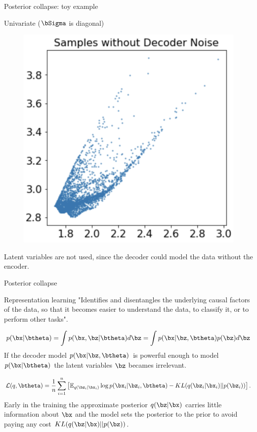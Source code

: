 \begin{frame}{Posterior collapse: toy example}
\begin{block}{Univariate ($\bSigma$ is diagonal)}
\begin{minipage}[t]{0.33\columnwidth}
\begin{figure}[h]
		\end{figure}
		\end{minipage}%
		\begin{minipage}[t]{0.33\columnwidth}
		\begin{figure}[h]
			\centering
			\includegraphics[width=.75\linewidth]{figs/posterior_collapse_toy_6.png}
		\end{figure}
		\end{minipage}
	Latent variables are not used, since the decoder could model the data without the encoder.
	\end{block}
\end{frame}
\begin{frame}{Posterior collapse}
	\begin{block}{Representation learning}
		"Identifies and disentangles the underlying causal factors of the data, so that it becomes easier to understand the data, to classify it, or to perform other tasks".
	\end{block}
	\[
		p(\bx | \btheta) = \int p(\bx, \bz | \btheta) d \bz = \int p(\bx | \bz, \btheta) p(\bz) d \bz 
	\]
	If the decoder model $p(\bx | \bz, \btheta)$ is powerful enough to model $p(\bx | \btheta)$ the latent variables $\bz$ becames irrelevant.
	
	\[
		\mathcal{L}(q, \btheta) = \frac{1}{n} \sum_{i=1}^n \left[ \mathbb{E}_{q(\bz_i | \bx_i)} \log p(\bx_i | \bz_i, \btheta) - KL(q(\bz_i | \bx_i) || p(\bz_i)) \right].
	\]
	Early in the training the approximate posterior $q(\bz|\bx)$ carries little information about $\bx$ and the model sets the posterior to the prior to avoid paying any cost $KL(q(\bz|\bx)||p(\bz))$.
\end{frame}
